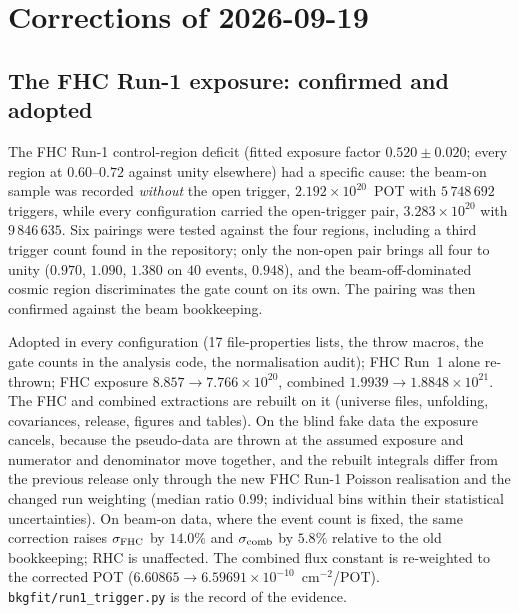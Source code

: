 \section{Corrections of 2026-09-19}

\subsection{The FHC Run-1 exposure: confirmed and adopted}
The FHC Run-1 control-region deficit (fitted exposure factor $0.520\pm0.020$; every region at
$0.60$--$0.72$ against unity elsewhere) had a specific cause: the beam-on sample was recorded
\emph{without} the open trigger, $2.192\times10^{20}$~POT with $5\,748\,692$ triggers, while every
configuration carried the open-trigger pair, $3.283\times10^{20}$ with $9\,846\,635$. Six pairings
were tested against the four regions, including a third trigger count found in the repository; only
the non-open pair brings all four to unity ($0.970$, $1.090$, $1.380$ on $40$ events, $0.948$), and
the beam-off-dominated cosmic region discriminates the gate count on its own. The pairing was then
confirmed against the beam bookkeeping.

Adopted in every configuration (17 file-properties lists, the throw macros, the gate counts in the
analysis code, the normalisation audit); FHC Run~1 alone re-thrown; FHC exposure $8.857\to
7.766\times10^{20}$, combined $1.9939\to1.8848\times10^{21}$. The FHC and combined extractions are
rebuilt on it (universe files, unfolding, covariances, release, figures and tables). On the blind
fake data the exposure cancels, because the pseudo-data are thrown at the assumed exposure and
numerator and denominator move together, and the rebuilt integrals differ from the previous release only
through the new FHC Run-1 Poisson realisation and the changed run weighting (median ratio $0.99$;
individual bins within their statistical uncertainties). On beam-on data, where the event count is
fixed, the same correction raises $\sigma_{\rm FHC}$ by $14.0\%$ and $\sigma_{\rm comb}$ by
$5.8\%$ relative to the old bookkeeping; RHC is unaffected. The combined flux constant is
re-weighted to the corrected POT ($6.60865\to6.59691\times10^{-10}$~cm$^{-2}$/POT). \texttt{bkgfit/run1\_trigger.py} is the record of the
evidence.

